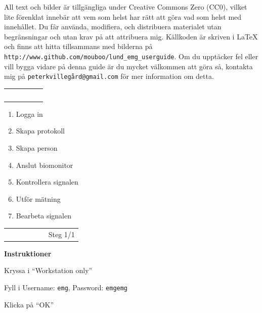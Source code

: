 \documentclass[10pt,a4paper]{article}
\newcommand*\circled[1]{\tikz[baseline=(char.base)]{
		\node[shape=circle,draw,minimum size=1em, inner sep=2pt] (char)
		{#1};}
}
\newcommand{\pagetitle}[2] {
	\begin{tabularx}{\linewidth}{>{\columncolor{darkpurple}}c >{\columncolor{lightpurple!35}}X}
		\LARGE \textcolor{white}{{#1}} & \LARGE {#2} \\[3pt]
	\end{tabularx}
}
\newenvironment{instructionsenv}
{
	\vspace{-4pt}
	\begin{purpleleftline}
		\vspace{2em}
		{\Large\bfseries{Instruktioner}}\par
		\vspace{1em}
	}
	{ 
	\end{purpleleftline}
}
\newcommand{\instruction}[2] {
	\textcolor{mycolor1}{\circled{\large {#1}}} 
	{\large #2}\par
}
\begin{document}
All text och bilder är tillgängliga under Creative Commons Zero (CC0), vilket lite förenklat innebär att vem som helst har rätt att göra vad som helst med innehållet. Du får använda, modifiera, och distribuera materialet utan begränsningar och utan krav på att attribuera mig. Källkoden är skriven i \LaTeX{} och finns att hitta tillsammans med bilderna på \verb|http://www.github.com/mouboo/lund_emg_userguide|. Om du upptäcker fel eller vill bygga vidare på denna guide är du mycket välkommen att göra så, kontakta mig på \verb|peterkvillegård@gmail.com| för mer information om detta.

\newpage


\pagetitle{Innehåll}{}\par
\vspace{3em}
{\Large

\begin{enumerate}[label={\Roman*},align=left]
\item Logga in 
\item Skapa protokoll 
\item Skapa person 
\item Anslut biomonitor 
\item Kontrollera signalen 
\item Utför mätning 
\item Bearbeta signalen 
\end{enumerate}
}

\newpage
{}


\pagetitle{I. Logga in}{Steg 1/1}

\begin{instructionsenv}
	\instruction{1}{Kryssa i ``Workstation only''}
	\instruction{2}{Fyll i Username: \texttt{emg}, Password: \texttt{emgemg}}
	\instruction{3}{Klicka på ``OK''}
\end{instructionsenv}

\vspace{50pt}
\end{document}
